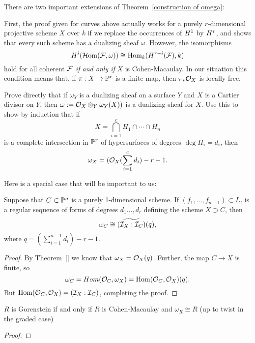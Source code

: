\begin{fact}  There are two important extensions of Theorem~\ref{construction of omega}:

First, the proof given for curves above actually works for a purely $r$-dimensional projective scheme $X$ over $k$ if we replace the occurrences of  $\HH^{1}$ by $\HH^{r}$, and shows that every such scheme has a dualizing sheaf $\omega$. However, the isomorphisms
$$
\HH^{i} (\sHom(\sF, \omega)) \cong \Hom_{k}(\HH^{r-i}(\sF), k) 
$$
hold for all coherent $\sF$ \emph{ if and only if} $X$ is Cohen-Macaulay. In our situation
this condition means that, if $\pi: X\to \PP^{r}$ is a finite map, then $\pi_{*}\cO_{X}$
is locally free.
\end{fact}

 

\begin{example} \label{canonical of CI}Prove directly that if $\omega_{Y}$ is a dualizing sheaf on a surface $Y$ and $X$ is a Cartier divisor on $Y$, then
$\omega := \cO_{X}\otimes_{Y}\omega_{Y}(X))$ is a dualizing sheaf for $X$.  
Use this to show by induction that if 
$$
X = \bigcap_{i=1}^{c}H_{1}\cap \cdots \cap H_{n}
$$ 
is a complete intersection
in $\PP^{r}$ of hypersurfaces of degrees $\deg H_{i} = d_{i}$,  then
$$
\omega_{X} = (\cO_{X}(\sum_{i=1}^{c} d_{i}) - r-1.
$$
\end{example}

Here is a special case that will be important to us:
\begin{proposition}\label{computation of omega}
 Suppose that 
$C \subset \PP^{n}$ is a purely 1-dimensional scheme. If $(f_{1}, \dots, f_{n-1}) \subset I_{C}$ is a regular sequence of forms of degrees $d_{1}\dots,d_{r}$ defining the scheme $X\supset C$, then 
$$
\omega_{C}\cong \widetilde{(\cI_{X}:\cI_{C})}(q),
$$
where $q = (\sum_{i=1}^{n-1} d_{i}) -r-1.$
\end{proposition}
\begin{proof}
 By Theorem~\ref{} we know that $\omega_{X} = \cO_{X}(q)$. Further, the map
 $C\to X$ is finite, so 
 $$
 \omega_{C} = Hom(\cO_{C}, \omega_{X}) = \Hom(\cO_{C}, \cO_{X})(q).
 $$
 But $\Hom(\cO_{C}, \cO_{X}) = (\cI_{X}:\cI_{C})$, completing the proof.
\end{proof}


\begin{theorem} \label{canonical of Gor}
 $R$ is Gorenstein if and only if $R$ is Cohen-Macaulay and $\omega_{R} \cong R$ (up to twist in the graded case)
\end{theorem}
\begin{proof}
 
\end{proof}
